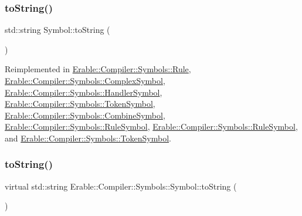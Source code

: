 \subsubsection{\texorpdfstring{toString()}{toString()}\hspace{0.1cm}{\footnotesize\ttfamily [1/2]}}
{\footnotesize\ttfamily std\+::string Symbol\+::to\+String (\begin{DoxyParamCaption}{ }\end{DoxyParamCaption})\hspace{0.3cm}{\ttfamily [virtual]}}



Reimplemented in \mbox{\hyperlink{class_erable_1_1_compiler_1_1_symbols_1_1_rule_a8bb5224d85a4867c71b6c1bc7ec901c0}{Erable\+::\+Compiler\+::\+Symbols\+::\+Rule}}, \mbox{\hyperlink{class_erable_1_1_compiler_1_1_symbols_1_1_complex_symbol_a90d749e601a727d6d42ddb195e65ea37}{Erable\+::\+Compiler\+::\+Symbols\+::\+Complex\+Symbol}}, \mbox{\hyperlink{class_erable_1_1_compiler_1_1_symbols_1_1_handler_symbol_ae0846995b3c622180725b160a1e17f8a}{Erable\+::\+Compiler\+::\+Symbols\+::\+Handler\+Symbol}}, \mbox{\hyperlink{class_erable_1_1_compiler_1_1_symbols_1_1_token_symbol_a0f8499152ff070ae70295c9b25b25b93}{Erable\+::\+Compiler\+::\+Symbols\+::\+Token\+Symbol}}, \mbox{\hyperlink{struct_erable_1_1_compiler_1_1_symbols_1_1_combine_symbol_aedd44bc23607d42bdb45a35aba3dd184}{Erable\+::\+Compiler\+::\+Symbols\+::\+Combine\+Symbol}}, \mbox{\hyperlink{class_erable_1_1_compiler_1_1_symbols_1_1_rule_symbol_a4fc1d4bfd6e2587308dc274fa0934511}{Erable\+::\+Compiler\+::\+Symbols\+::\+Rule\+Symbol}}, \mbox{\hyperlink{class_erable_1_1_compiler_1_1_symbols_1_1_rule_symbol_a4fc1d4bfd6e2587308dc274fa0934511}{Erable\+::\+Compiler\+::\+Symbols\+::\+Rule\+Symbol}}, and \mbox{\hyperlink{class_erable_1_1_compiler_1_1_symbols_1_1_token_symbol_a0f8499152ff070ae70295c9b25b25b93}{Erable\+::\+Compiler\+::\+Symbols\+::\+Token\+Symbol}}.

\mbox{\label{class_erable_1_1_compiler_1_1_symbols_1_1_symbol_ad32fcce939908335ae03f020f3a680e8}} 
\subsubsection{\texorpdfstring{toString()}{toString()}\hspace{0.1cm}{\footnotesize\ttfamily [2/2]}}
{\footnotesize\ttfamily virtual std\+::string Erable\+::\+Compiler\+::\+Symbols\+::\+Symbol\+::to\+String (\begin{DoxyParamCaption}{ }\end{DoxyParamCaption})\hspace{0.3cm}{\ttfamily [pure virtual]}}



